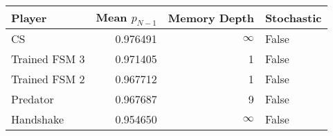 \begin{tabular}{lrrl}
\toprule
        Player &  Mean $p_{N-1}$ &  Memory Depth & Stochastic \\
\midrule
            CS &        0.976491 &            \(\infty\) &      False \\
 Trained FSM 3 &        0.971405 &             1 &      False \\
 Trained FSM 2 &        0.967712 &             1 &      False \\
      Predator &        0.967687 &             9 &      False \\
     Handshake &        0.954650 &            \(\infty\) &      False \\
\bottomrule
\end{tabular}
